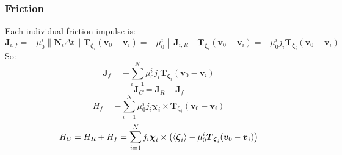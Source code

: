 \documentclass[10pt]{report}
\begin{document}
\subsubsection{Friction}
Each individual friction impulse is:
\begin{equation}\boldsymbol{J}_{i,f}=-\mu_0^i\|\boldsymbol{N}_i\Delta t\|\boldsymbol{T}_{\boldsymbol{\zeta}_i}(\boldsymbol{v}_0-\boldsymbol{v}_i)=-\mu_0^i\left\|\boldsymbol{J}_{i,R}\right\|\boldsymbol{T}_{\boldsymbol{\zeta}_i}(\boldsymbol{v}_0-\boldsymbol{v}_i)=-\mu_0^ij_i\boldsymbol{T}_{\boldsymbol{\zeta}_i}(\boldsymbol{v}_0-\boldsymbol{v}_i)\end{equation}
So:
\begin{equation}\boldsymbol{J}_f=-\sum_{i=1}^N\mu_0^ij_i\boldsymbol{T}_{\boldsymbol{\zeta}_i}(\boldsymbol{v}_0-\boldsymbol{v}_i)\end{equation}
\begin{equation}\boldsymbol{J}_C=\boldsymbol{J}_R+\boldsymbol{J}_f\end{equation}
\begin{equation}H_f=-\sum_{i=1}^N\mu_0^ij_i\boldsymbol{\chi}_i\times\boldsymbol{T}_{\boldsymbol{\zeta}_i}(\boldsymbol{v}_0-\boldsymbol{v}_i)\end{equation}
\begin{equation}H_C=H_R+H_f=\sum_{i=1}^Nj_i\boldsymbol{\chi}_i\times\left(\braket{\boldsymbol{\zeta}_i}-\mu_0^i\boldsymbol{T}_{\boldsymbol{\zeta}_i}(\boldsymbol{v}_0-\boldsymbol{v}_i)\right)\end{equation}
\end{document}
